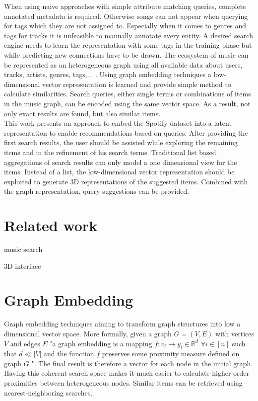\documentclass[sigconf]{acmart}
\begin{document}
When using naive approaches with simple attribute matching queries, complete annotated metadata is required. Otherwise songs can not appear when querying for tags which they are not assigned to. Especially when it comes to genres and tags for tracks it is unfeasible to manually annotate every entity. A desired search engine needs to learn the representation with some tags in the training phase but while predicting new connections have to be drawn.
The ecosystem of music can be represented as an heterogeneous graph using all available data about users, tracks, artists, genres, tags,... . Using graph embedding techniques a low-dimensional vector representation is learned and provide simple method to calculate similarities. Search queries, either single terms or combinations of items in the music graph, can be encoded using the same vector space. As a result, not only exact results are found, but also similar items. \\

This work presents an approach to embed the Spotify dataset into a latent representation to enable recommendations based on queries. After providing the first search results, the user should be assisted while exploring the remaining items and in the refinement of his search terms. Traditional list based aggregations of search results can only model a one dimensional view for the items. Instead of a list, the low-dimensional vector representation should be exploited to generate 3D representations of the suggested items. Combined with the graph representation, query suggestions can be provided.



\section{Related work}

music search \cite{chen2016query}

3D interface \cite{lamere2007using}


\section{Graph Embedding}
Graph embedding techniques aiming to transform graph structures into low a dimensional vector space. More formally, given a graph $ G = (V,E) $ with vertices $ V $ and edges $ E $ "a graph embedding is a mapping $ f : v_{i} \rightarrow y_{i} \in \mathbb{R}^{d} $ $ \forall i \in [n] $ such that $ d \ll |V| $ and the function $ f $ preserves some proximity measure defined on graph $ G $ "\cite{goyal2017graph}. The final result is therefore a vector for each node in the initial graph. Having this coherent search space makes it much easier to calculate higher-order proximities between heterogeneous nodes. Similar items can be retrieved using nearest-neighboring searches.
\end{document}

